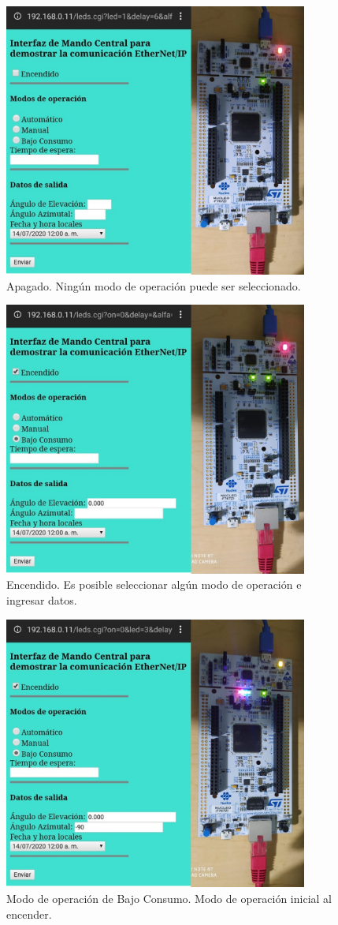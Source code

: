 \begin{figure}[H]
	\centering
	\includegraphics[width=10cm]{imagenes/MC_OFF}
	\caption{Apagado. Ningún modo de operación puede ser seleccionado.}
	\label{fig:MC_OFF}
\end{figure}
\begin{figure}[H]
	\centering
	\includegraphics[width=10cm]{imagenes/MC_ON}
	\caption{Encendido. Es posible seleccionar algún modo de operación e ingresar datos.}
	\label{fig:MC_ON}
\end{figure}
\begin{figure}[H]
	\centering
	\includegraphics[width=10cm]{imagenes/MC_BC}
	\caption{Modo de operación de Bajo Consumo. Modo de operación inicial al encender.}
	\label{fig:MC_BC}
\end{figure}
